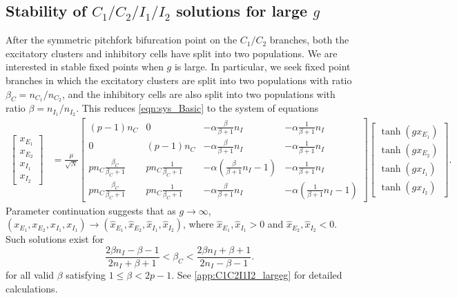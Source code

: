 \documentclass[reqno]{siamonline190516}
\begin{document}
\subsection{Stability of \texorpdfstring{$C_1/C_2/I_1/I_2$}{C1/C2/I1/I2} solutions for large \texorpdfstring{$g$}{g}}\label{sec:C1C2I1I2_largeg}

After the symmetric pitchfork bifurcation point on the $C_1/C_2$ branches, both the excitatory clusters and inhibitory cells have split into two populations. We are interested in stable fixed points when $g$ is large. In particular, we seek fixed point branches in which the excitatory clusters are split into two populations with ratio $\beta_C = n_{C_1}/n_{C_2}$, and the inhibitory cells are also split into two populations with ratio $\beta = n_{I_1}/n_{I_2}$. This reduces \cref{eqn:sys_Basic} to the system of equations
\begin{equation}\label{eq:cluster4system}
    \begin{aligned}
    \begin{bmatrix} x_{E_1} \\ x_{E_2} \\ x_{I_1} \\ x_{I_2} \end{bmatrix} 
    &= \frac{\mu}{\sqrt{N}} 
    \begin{bmatrix} 
       (p-1)n_C & 0 & -\alpha \frac{\beta}{\beta+1}n_I &  -\alpha \frac{1}{\beta+1}n_I \\
       0  & (p-1)n_C & -\alpha \frac{\beta}{\beta+1}n_I &  -\alpha \frac{1}{\beta+1}n_I \\
       p n_C \frac{\beta_C}{\beta_C+1} &
       p n_C \frac{1}{\beta_C+1} &
       -\alpha \left(\frac{\beta}{\beta+1}n_I-1\right) &  -\alpha \frac{1}{\beta+1}n_I \\
       p n_C \frac{\beta_C}{\beta_C+1} &
       p n_C \frac{1}{\beta_C+1} &
       -\alpha \frac{\beta}{\beta+1}n_I & -\alpha \left(\frac{1}{\beta+1}n_I - 1 \right)
    \end{bmatrix}
    \begin{bmatrix} \tanh(g x_{E_1}) \\ \tanh ( g x_{E_2} ) \\\tanh(g x_{I_1}) \\\tanh(g x_{I_2})  \end{bmatrix}.
    \end{aligned}
\end{equation}
Parameter continuation suggests that as $g \rightarrow \infty$, $(x_{E_1}, x_{E_2}, x_{I_1}, x_{I_1}) \rightarrow (\hat{x}_{E_1}, \hat{x}_{E_2}, \hat{x}_{I_1}, \hat{x}_{I_2})$, where $\hat{x}_{E_1}, \hat{x}_{I_1} > 0$ and $\hat{x}_{E_2}, \hat{x}_{I_2} < 0$. Such solutions exist for 
\begin{equation}\label{eq:bccondition}
    \frac{2 \beta n_I - \beta - 1}{2 n_I + \beta + 1} < \beta_C < \frac{2 \beta n_I + \beta + 1}{2 n_I - \beta - 1}.
\end{equation}
for all valid $\beta$ satisfying $1 \leq \beta < 2p-1$. See \cref{app:C1C2I1I2_largeg} for detailed calculations.
\end{document}
